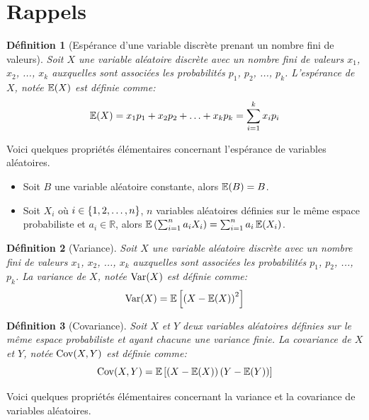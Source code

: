 \documentclass[10pt]{article}
\newtheorem{definition}{Définition}
\begin{document}
\appendix

\hypertarget{rappels}{%
\section{\texorpdfstring{Rappels
\label{rappel_esperance}}{Rappels }}\label{rappels}}

\begin{definition}[Espérance d'une variable discrète prenant un nombre fini de valeurs]
Soit $X$ une variable aléatoire discrète avec un nombre fini de valeurs $x_1$, $x_2$, ..., $x_k$ auxquelles sont associées les probabilités $p_1$, $p_2$, ..., $p_k$. L'espérance de $X$, notée $\operatorname{\mathbb{E}} (X)$ est définie comme:
$$ \operatorname{\mathbb{E}} (X) = x_1p_1+x_2p_2+\ldots +x_kp_k = \sum_{i=1}^k x_i p_i $$
\end{definition}

Voici quelques propriétés élémentaires concernant l'espérance de
variables aléatoires.

\begin{itemize}
\item
  Soit \(B\) une variable aléatoire constante, alors \(\operatorname{\mathbb{E}}(B)=B\).
\item
  Soit \(X_i\) où \(i\in\left\{1,2,\ldots,n\right\}\), \(n\) variables aléatoires
  définies sur le même espace probabiliste et \(a_i\in\mathbb{R}\),
  alors \(\operatorname{\mathbb{E}}\left(\sum_{i=1}^na_iX_i\right)=\sum_{i=1}^n a_i\operatorname{\mathbb{E}}(X_i)\).
\end{itemize}

\begin{definition}[Variance]
Soit $X$ une variable aléatoire discrète avec un nombre fini de valeurs $x_1$, $x_2$, ..., $x_k$ auxquelles sont associées les probabilités $p_1$, $p_2$, ..., $p_k$. La variance de $X$, notée $\operatorname{Var} (X)$ est définie comme:
$$ \operatorname{Var} (X) = \operatorname{\mathbb{E}}\left[\left(X-\operatorname{\mathbb{E}}(X)\right)^2\right] $$
\end{definition}

\begin{definition}[Covariance]
Soit $X$ et $Y$ deux variables aléatoires définies sur le même espace probabiliste et ayant chacune une variance finie. La covariance de $X$ et $Y$, notée $\operatorname{Cov}(X,Y)$ est définie comme:
$$ \operatorname{Cov}(X,Y)=\operatorname{\mathbb{E}}\left[\left(X-\operatorname{\mathbb{E}}(X)\right)\left(Y-\operatorname{\mathbb{E}}(Y)\right)\right] $$
\end{definition}

Voici quelques propriétés élémentaires concernant la variance et la
covariance de variables aléatoires.
\end{document}
